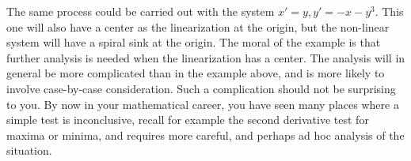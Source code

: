 \documentclass{ximera}
\begin{document}
The same process could be carried out with the system $x'=y, y' = -x-y^3$. This one will also have a center as the linearization at the origin, but the non-linear system will have a spiral sink at the origin. The moral of the example is that further analysis is needed when the linearization has a center.  The analysis will in general be more complicated than in the example above, and is more likely to involve case-by-case consideration.  Such a complication should not be surprising to you.  By now in your mathematical career, you have seen many places where a simple test is inconclusive, recall for example the second derivative test for maxima or minima, and requires more careful, and perhaps ad hoc analysis of the situation.
\end{document}

